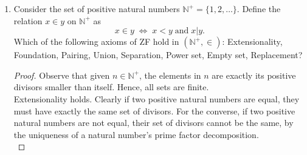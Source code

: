 \documentclass{article}
\begin{document}
\begin{enumerate}
\begin{proof}
      Next, we show that $\alpha$ is also the least non-empty limit ordinal.
      $\alpha$ is clearly non-empty since it contains the empty set. Assume
      by contradiction that $\beta$ is a non-empty limit ordinal that is
      smaller than $\alpha$. Being a limit ordinal, $\beta$ must be closed
      under successor: if there is a $\gamma\in\beta$ whose successor
      $S(\gamma)$ is not in $\beta$, then $\beta$ must either be equal
      $S(\gamma)$ or be smaller than $S(\gamma)$. The former cannot be true
      since $\beta$ is a limit ordinal. Yet the latter also cannot be true
      because ordinals containing $\gamma$ must either equal $S(\gamma)$ or
      contain $S(\gamma)$. So $\beta$ is non-empty, closed under
      successor, and smaller than $\alpha$, which contradicts our earlier
      proof that $\alpha$ is the least non-empty ordinal closed under
      successor. \\

      Finally, we show that $\alpha$ is also the least infinite ordinal.
      Assume by contradiction that the least infinite ordinal $\beta$ is
      contained in $\alpha$. Then since $\alpha$ is the least non-empty
      limit ordinal as we have shown in the previous paragraph, $\beta$
      must be a successor ordinal. Then the predecessor of $\beta$ would
      also be an infinite ordinal, which contradicts our choice of $\beta$
      as the least infinite ordinal. 
    \end{proof}

  \item Consider the set of positive natural numbers
    $\mathbb{N}^+=\{1,2,\ldots\}$. Define the relation $x\in y$ on
    $\mathbb{N}^+$ as
    \begin{equation*}
      x\in y\; \Leftrightarrow\; x<y\; \text{and}\; x|y.
    \end{equation*}
    Which of the following axioms of ZF hold in $(\mathbb{N}^+,\in)$:
    Extensionality, Foundation, Pairing, Union, Separation, Power set,
    Empty set, Replacement?

    \begin{proof}
      Observe that given $n\in\mathbb{N}^+$, the elements in $n$ are
      exactly its positive divisors smaller than itself. Hence, all sets
      are finite. \\

      Extensionality holds. Clearly if two positive natural numbers are
      equal, they must have exactly the same set of divisors. For the
      converse, if two positive natural numbers are not equal, their set of
      divisors cannot be the same, by the uniqueness of a natural number's
      prime factor decomposition. \\


\end{proof}
\end{enumerate}
\end{document}
